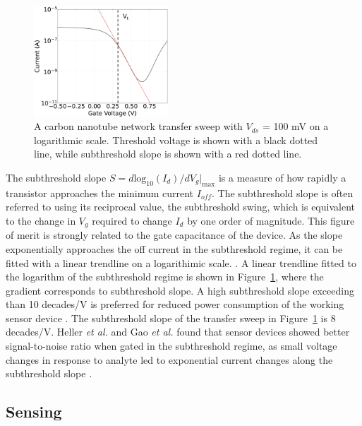 \documentclass[
  a4paper,
]{scrbook}
\begin{document}
\begin{figure}

{\centering \includegraphics[width=0.45\textwidth,height=\textheight]{figures/ch2/NTQ31C5ch1subthreshold_slope_alt.png}

}

\caption{\label{fig-subthreshold-slope}A carbon nanotube network
transfer sweep with \(V_{ds}\) = 100 mV on a logarithmic scale.
Threshold voltage is shown with a black dotted line, while subthreshold
slope is shown with a red dotted line.}

\end{figure}

The subthreshold slope
\(S = d\textrm{log}_{10}(I_{d})/dV_g|_{\textrm{max}}\) is a measure of
how rapidly a transistor approaches the minimum current \(I_{off}\). The
subthreshold slope is often referred to using its reciprocal value, the
subthreshold swing, which is equivalent to the change in \(V_g\)
required to change \(I_d\) by one order of magnitude. This figure of
merit is strongly related to the gate capacitance of the device. As the
slope exponentially approaches the off current in the subthreshold
regime, it can be fitted with a linear trendline on a logarithimic
scale. \autocite{Sze2006,Petti2016}. A linear trendline fitted to the
logarithm of the subthreshold regime is shown in
Figure~\ref{fig-subthreshold-slope}, where the gradient corresponds to
subthreshold slope. A high subthreshold slope exceeding than 10
decades/V is preferred for reduced power consumption of the working
sensor device \autocite{Petti2016}. The subthreshold slope of the
transfer sweep in Figure~\ref{fig-subthreshold-slope} is 8 decades/V.
Heller \emph{et al.} and Gao \emph{et al.} found that sensor devices
showed better signal-to-noise ratio when gated in the subthreshold
regime, as small voltage changes in response to analyte led to
exponential current changes along the subthreshold slope
\autocite{Heller2009,Gao2010}.

\hypertarget{sec-CNT-sensing-mechanisms}{%
\subsection{Sensing}\label{sec-CNT-sensing-mechanisms}}
\end{document}
